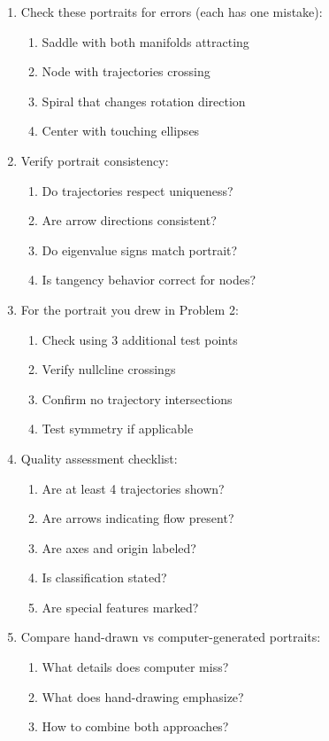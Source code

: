 \documentclass[12pt]{article}
\begin{document}
\begin{enumerate}[resume]
\item Check these portraits for errors (each has one mistake):
\begin{enumerate}[label=(\alph*)]
    \item Saddle with both manifolds attracting
    \item Node with trajectories crossing
    \item Spiral that changes rotation direction
    \item Center with touching ellipses
\end{enumerate}

\item Verify portrait consistency:
\begin{enumerate}[label=(\alph*)]
    \item Do trajectories respect uniqueness?
    \item Are arrow directions consistent?
    \item Do eigenvalue signs match portrait?
    \item Is tangency behavior correct for nodes?
\end{enumerate}

\item For the portrait you drew in Problem 2:
\begin{enumerate}[label=(\alph*)]
    \item Check using 3 additional test points
    \item Verify nullcline crossings
    \item Confirm no trajectory intersections
    \item Test symmetry if applicable
\end{enumerate}

\item Quality assessment checklist:
\begin{enumerate}[label=(\alph*)]
    \item Are at least 4 trajectories shown?
    \item Are arrows indicating flow present?
    \item Are axes and origin labeled?
    \item Is classification stated?
    \item Are special features marked?
\end{enumerate}

\item Compare hand-drawn vs computer-generated portraits:
\begin{enumerate}[label=(\alph*)]
    \item What details does computer miss?
    \item What does hand-drawing emphasize?
    \item How to combine both approaches?
\end{enumerate}
\end{enumerate}
\end{document}
